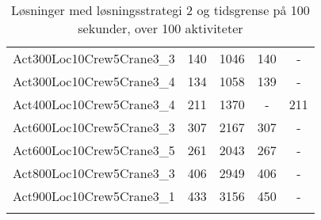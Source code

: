 {\begin{center}
\begin{longtable}{ | l | c | c | c | c | }
Act300Loc10Crew5Crane3\_3	&	140	&	1046	&	140	&	-	\\
Act300Loc10Crew5Crane3\_4	&	134	&	1058	&	139	&	-	\\
Act400Loc10Crew5Crane3\_4	&	211	&	1370	&	-	&	211	\\
Act600Loc10Crew5Crane3\_3	&	307	&	2167	&	307	&	-	\\
Act600Loc10Crew5Crane3\_5	&	261	&	2043	&	267	&	-	\\
Act800Loc10Crew5Crane3\_3	&	406	&	2949	&	406	&	-	\\
Act900Loc10Crew5Crane3\_1	&	433	&	3156	&	450	&	-	\\
\hline							
\caption{Løsninger med løsningsstrategi 2 og tidsgrense på 100 sekunder, over 100 aktiviteter}			
\label{tab:solutionSSTFAARF100s}							
\end{longtable}				
\end{center}

}
